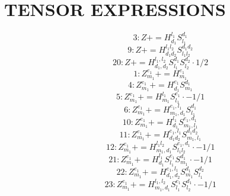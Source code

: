 \documentclass[letterpaper,10pt,fleqn,leqno,onecolumn]{article}
\begin{document}
\section{TENSOR EXPRESSIONS}
\begin{equation} \;\;\;\;\;\;  3: Z+=H^{l_{1}}_{d_{1}}S^{d_{1}}_{l_{1}} \end{equation}
\begin{equation} \;\;\;\;\;\;  9: Z+=H^{l_{1}l_{2}}_{d_{1}d_{2}}S^{d_{1}d_{2}}_{l_{1}l_{2}} \end{equation}
\begin{equation} \;\;\;\;\;\;  20: Z+=H^{l_{1},l_{2}}_{d_{1},d_{2}}S^{d_{1}}_{l_{1}}S^{d_{2}}_{l_{2}}\cdot 1/2 \end{equation}
\begin{equation} \;\;\;\;\;\;  1: Z^{e_{1}}_{m_{1}}+=H^{e_{1}}_{m_{1}} \end{equation}
\begin{equation} \;\;\;\;\;\;  4: Z^{e_{1}}_{m_{1}}+=H^{e_{1}}_{d_{1}}S^{d_{1}}_{m_{1}} \end{equation}
\begin{equation} \;\;\;\;\;\;  5: Z^{e_{1}}_{m_{1}}+=H^{l_{1}}_{m_{1}}S^{e_{1}}_{l_{1}}\cdot -1/1 \end{equation}
\begin{equation} \;\;\;\;\;\;  6: Z^{e_{1}}_{m_{1}}+=H^{e_{1},l_{1}}_{m_{1},d_{1}}S^{d_{1}}_{l_{1}} \end{equation}
\begin{equation} \;\;\;\;\;\;  10: Z^{e_{1}}_{m_{1}}+=H^{l_{1}}_{d_{1}}S^{e_{1},d_{1}}_{m_{1},l_{1}} \end{equation}
\begin{equation} \;\;\;\;\;\;  11: Z^{e_{1}}_{m_{1}}+=H^{e_{1},l_{1}}_{d_{1}d_{2}}S^{d_{1}d_{2}}_{m_{1},l_{1}} \end{equation}
\begin{equation} \;\;\;\;\;\;  12: Z^{e_{1}}_{m_{1}}+=H^{l_{1}l_{2}}_{m_{1},d_{1}}S^{e_{1},d_{1}}_{l_{1}l_{2}}\cdot -1/1 \end{equation}
\begin{equation} \;\;\;\;\;\;  21: Z^{e_{1}}_{m_{1}}+=H^{l_{1}}_{d_{1}}S^{e_{1}}_{l_{1}}S^{d_{1}}_{m_{1}}\cdot -1/1 \end{equation}
\begin{equation} \;\;\;\;\;\;  22: Z^{e_{1}}_{m_{1}}+=H^{e_{1},l_{1}}_{d_{1},d_{2}}S^{d_{1}}_{m_{1}}S^{d_{2}}_{l_{1}} \end{equation}
\begin{equation} \;\;\;\;\;\;  23: Z^{e_{1}}_{m_{1}}+=H^{l_{1},l_{2}}_{m_{1},d_{1}}S^{e_{1}}_{l_{1}}S^{d_{1}}_{l_{2}}\cdot -1/1 \end{equation}
\end{document}
